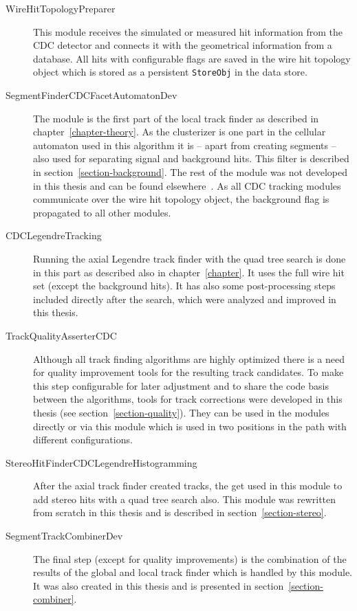 \begin{description}
  \item[Wire\-Hit\-Topology\-Preparer] This module receives the simulated or measured hit information from the CDC detector and connects it with the geometrical information from a database. All hits with configurable flags are saved in the wire hit topology object which is stored as a persistent \texttt{StoreObj} in the data store.
  \item[Segment\-Finder\-CDC\-Facet\-Automaton\-Dev] The module is the first part of the local track finder as described in chapter~\ref{chapter-theory}. As the clusterizer is one part in the cellular automaton used in this algorithm it is -- apart from creating segments -- also used for separating signal and background hits. This filter is described in section~\ref{section-background}. The rest of the module was not developed in this thesis and can be found elsewhere~\cite{oliver}. As all CDC tracking modules communicate over the wire hit topology object, the background flag is propagated to all other modules.
  \item[CDC\-Legendre\-Tracking] Running the axial Legendre track finder with the quad tree search is done in this part as described also in chapter~\ref{chapter}. It uses the full wire hit set (except the background hits). It has also some post-processing steps included directly after the search, which were analyzed and improved in this thesis. 
  \item[Track\-Quality\-Asserter\-CDC] Although all track finding algorithms are highly optimized there is a need for quality improvement tools for the resulting track candidates. To make this step configurable for later adjustment and to share the code basis between the algorithms, tools for track corrections were developed in this thesis (see section~\ref{section-quality}). They can be used in the modules directly or via this module which is used in two positions in the path with different configurations.
  \item[Stereo\-Hit\-Finder\-CDC\-Legendre\-Histogramming] After the axial track finder created tracks, the get used in this module to add stereo hits with a quad tree search also. This module was rewritten from scratch in this thesis and is described in section~\ref{section-stereo}.
  \item[Segment\-Track\-Combiner\-Dev] The final step (except for quality improvements) is the combination of the results of the global and local track finder which is handled by this module. It was also created in this thesis and is presented in section~\ref{section-combiner}.
\end{description}


